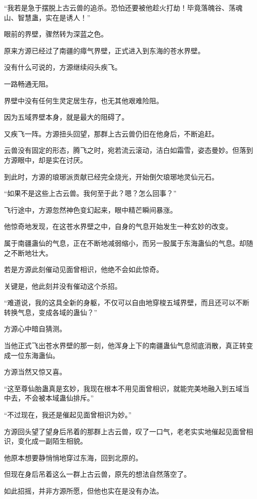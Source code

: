 \begin{this_body}
“我若是急于摆脱上古云兽的追杀。恐怕还要被他趁火打劫！毕竟落魄谷、荡魂山、智慧蛊，实在是诱人！”

眼前的界壁，骤然转为深蓝之色。

原来方源已经过了南疆的瘴气界壁，正式进入到东海的苍水界壁。

没有什么可说的，方源继续闷头疾飞。

一路畅通无阻。

界壁中没有任何生灵定居生存，也无其他艰难险阻。

因为五域界壁本身，就是最大的阻碍了。

又疾飞一阵。方源扭头回望，那群上古云兽仍旧在他身后，不断追赶。

云兽没有固定的形态，腾飞之时，宛若流云滚动，洁白如霜雪，姿态曼妙。但落到方源眼中，却是实在讨厌。

到此时，方源的琅琊派贡献已经完全烧光，开始倒欠琅琊地灵仙元石。

“如果不是这些上古云兽。我何至于此？嗯？怎么回事？”

飞行途中，方源忽然神色变幻起来，眼中精芒瞬间暴涨。

他惊奇地发现，在这苍水界壁之中，自身的气息开始发生一种玄妙的改变。

属于南疆蛊仙的气息，正在不断地减弱缩小，而另一股属于东海蛊仙的气息。却随之不断地壮大。

若是方源此刻催动见面曾相识，他绝不会如此惊奇。

关键是，他此刻并没有催动这个杀招。

“难道说，我的这具全新的身躯，不仅可以自由地穿梭五域界壁，而且还可以不断转换气息，变成各域的蛊仙？”

方源心中暗自猜测。

当他正式飞出苍水界壁的那一刻，他浑身上下的南疆蛊仙气息彻底消散，真正转变成一位东海蛊仙。

方源当然又惊又喜。

“这至尊仙胎蛊真是玄妙，我现在根本不用见面曾相识，就能完美地融入到五域当中去，不会被本域蛊仙排斥。”

“不过现在，我还是催起见面曾相识为妙。”

方源回头望了望身后吊着的那群上古云兽，叹了一口气，老老实实地催起见面曾相识，变化成一副陌生相貌。

他原本想要静悄悄地穿过东海，回到北原的。

但现在身后吊着这么一群上古云兽，原先的想法自然落空了。

如此招摇，并非方源所愿，但他也实在是没有办法。


\end{this_body}
